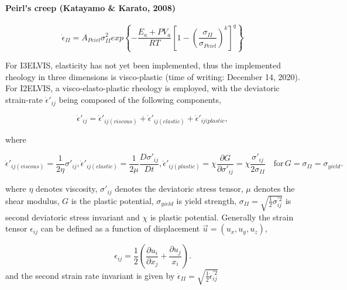 \paragraph{Peirl's creep (Katayamo \& Karato, 2008)}
\begin{equation}\label{eqs:peirls_strain_rate}
\dot{\epsilon}_{II} = A_{Peirl} \sigma_{II}^2 exp \left\lbrace -\dfrac{E_a + P V_a}{R T}  \left[ 1- \left( \dfrac{\sigma_{II}}{\sigma_{Peirl}} \right) ^k \right] ^q \right\rbrace
\end{equation}

For I3ELVIS, elasticity has not yet been implemented, thus the implemented rheology in three dimensions is visco-plastic (time of writing: December 14, 2020).
For I2ELVIS, a visco-elasto-plastic rheology is employed, with the deviatoric strain-rate $\dot{\epsilon}'_{ij}$ being composed of the following components,

\begin{equation}
\dot{\epsilon}'_{ij} = \dot{\epsilon}'_{ij(viscous)} + \dot{\epsilon}'_{ij(elastic)} + \dot{\epsilon}'_{ij(plastic},
\end{equation}

where

\begin{subequations}
\begin{equation}
\dot{\epsilon}'_{ij(viscous)} = \dfrac{1}{2 \eta} \sigma'_{ij},
\end{equation}
\begin{equation}
\dot{\epsilon}'_{ij(elastic)} = \dfrac{1}{2 \mu} \dfrac{D \sigma'_{ij}}{D t},
\end{equation}
\begin{equation}
\dot{\epsilon}'_{ij(plastic)} = \chi \dfrac{\partial G}{\partial \sigma'_{ij}} = \chi \dfrac{\sigma'_{ij}}{2 \sigma_{II}} \quad \text{for}\, G = \sigma_{II} = \sigma_{yield}.
\end{equation}
\end{subequations}

where $\eta$ denotes viscosity, $\sigma'_{ij}$ denotes the deviatoric stress tensor, $\mu$ denotes the shear modulus, $G$ is the plastic potential, $\sigma_{yield}$ is yield strength, $\sigma_{II}=\sqrt{\frac{1}{2}\sigma_{ij}^{'2}}$ is second deviatoric stress invariant and $\chi$ is plastic potential.
Generally the strain tensor $\epsilon_{ij}$ can be defined as a function of displacement $\vec{u} = (u_x, u_y, u_z)$,

\begin{equation}\label{strain}
\epsilon_{ij} = \dfrac{1}{2} \left(\dfrac{\partial u_i}{\partial x_j} + \dfrac{\partial u_j}{x_i}\right).
\end{equation}
and the second strain rate invariant is given by $\dot{\epsilon}_{II} = \sqrt{\frac{1}{2}\dot{\epsilon}_{ij}^{'2}}$

